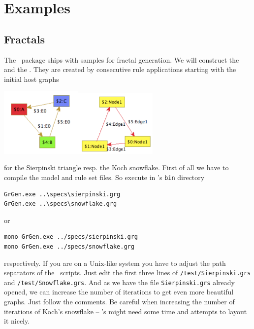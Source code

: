 \chapter{Examples}
\label{anexample}

\section{Fractals}
\label{fractals}
The \GrG\ package ships with samples for fractal generation. We will construct the  and the . They are created by consecutive rule applications starting with the initial host graphs
\begin{center}
\includegraphics[width=4cm]{fig/startsir}\quad\quad\includegraphics[width=4cm]{fig/startkoch}
\end{center}
for the Sierpinski triangle resp. the Koch snowflake. 
First of all we have to compile the model and rule set files. So execute in \GrG's \texttt{bin} directory
\begin{verbatim}
GrGen.exe ..\specs\sierpinski.grg
GrGen.exe ..\specs\snowflake.grg
\end{verbatim}
or
\begin{verbatim}
mono GrGen.exe ../specs/sierpinski.grg
mono GrGen.exe ../specs/snowflake.grg
\end{verbatim}
respectively. If you are on a Unix-like system you have to adjust the path separators of the \GrShell\ scripts. Just edit the first three lines of \texttt{/test/Sierpinski.grs} and \texttt{/test/Snowflake.grs}. And as we have the file \texttt{Sierpinski.grs} already opened, we can increase the number of iterations to get even more beautiful graphs. Just follow the comments. Be careful when increasing the number of iterations of Koch's snowflake -- \yComp's  might need some time and attempts to layout it nicely.\\
